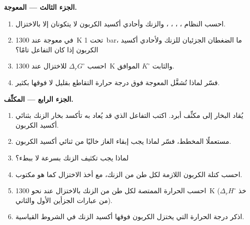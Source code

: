 \begin{problem}
\medskip
\noindent\textbf{الجزء الثالث --- المعوجة.}
\begin{enumerate}[resume]
  \item احسب  النظام ، ، ،
        ، والزنك وأحادي أكسيد الكربون لا يتكونان إلا بالاختزال.
  \item في معوجة عند \qty{1300}{K} تحت \qty{1}{bar}، ما الضغطان الجزئيان
        للزنك ولأحادي أكسيد الكربون إذا كان التفاعل تامًا؟
  \item احسب $\Delta_r G^\circ$ للاختزال عند \qty{1300}{K} والثابت
        $K^\circ$ الموافق.
  \item فسّر لماذا تُشغَّل المعوجة فوق درجة حرارة التقاطع بقليل
        لا فوقها بكثير.
\end{enumerate}

\medskip
\noindent\textbf{الجزء الرابع --- المكثِّف.}
\begin{enumerate}[resume]
  \item يُقاد البخار إلى مكثِّف أبرد. اكتب التفاعل الذي قد يُعاد به
        تأكسد بخار الزنك بثنائي أكسيد الكربون.
  \item مستعملًا المخطط، فسّر لماذا يجب إبقاء الغاز خاليًا من ثنائي
        أكسيد الكربون.
  \item لماذا يجب تكثيف الزنك بسرعة لا ببطء؟
  \item احسب كتلة الكربون اللازمة لكل طن من الزنك، مع أخذ
        الاختزال كما هو مكتوب.
  \item احسب الحرارة الممتصة لكل طن من الزنك بالاختزال عند نحو
        \qty{1300}{K} (خذ $\Delta_r H^\circ$ من عبارات الجزأين الأول
        والثاني).
  \item اذكر درجة الحرارة التي يختزل الكربون فوقها أكسيد الزنك في
        الشروط القياسية.
\end{enumerate}
\end{problem}
